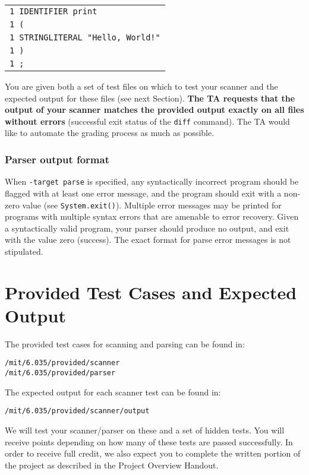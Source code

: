 \begin{center}
\begin{tabular}{l}
\texttt{1 IDENTIFIER print} \\
\texttt{1 (}\\
\texttt{1 STRINGLITERAL "Hello, World!"} \\
\texttt{1 )} \\
\texttt{1 ;}
\end{tabular}
\end{center}

You are given both a set of test files on which to test your scanner
and the expected output for these files (see next Section).  {\bf
The TA requests that the output of your scanner matches the provided
output exactly on all files without errors} (successful exit status
of the {\tt diff} command). The TA would like to automate the
grading process as much as possible.

\subsubsection*{Parser output format}
When {\tt -target parse} is specified, any syntactically incorrect
program should be flagged with at least one error message, and the
program should exit with a non-zero value (see {\tt System.exit()}).
Multiple error messages may be printed for programs with multiple
syntax errors that are amenable to error recovery. Given a
syntactically valid program, your parser should produce no output,
and exit with the value zero (success). The exact format for parse
error messages is not stipulated.

\section*{Provided Test Cases and Expected Output}

The provided test cases for scanning and parsing can be found in:

\begin{verbatim}
/mit/6.035/provided/scanner
/mit/6.035/provided/parser
\end{verbatim}

The expected output for each scanner test can be found in:
\begin{verbatim}
/mit/6.035/provided/scanner/output
\end{verbatim}

We will test your scanner/parser on these and a set of hidden tests.
You will receive points depending on how many of these tests are
passed successfully.  In order to receive full credit, we also expect
you to complete the written portion of the project as described in the
Project Overview Handout.

